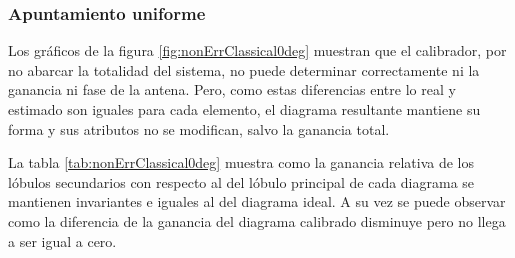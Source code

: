 \subsubsection{Apuntamiento uniforme}

Los gráficos de la figura \ref{fig:nonErrClassical0deg} muestran que el calibrador, por no abarcar la totalidad del sistema, no 
puede determinar correctamente ni la ganancia ni fase de la antena. Pero, como estas diferencias entre lo real y estimado son 
iguales para cada elemento, el diagrama resultante mantiene su forma y sus atributos no se modifican, salvo la ganancia total.

La tabla \ref{tab:nonErrClassical0deg} muestra como la ganancia relativa de los lóbulos secundarios con respecto al del lóbulo
principal de cada diagrama se mantienen invariantes e iguales al del diagrama ideal. A su vez se puede observar como la diferencia
de la ganancia del diagrama calibrado disminuye pero no llega a ser igual a cero.
